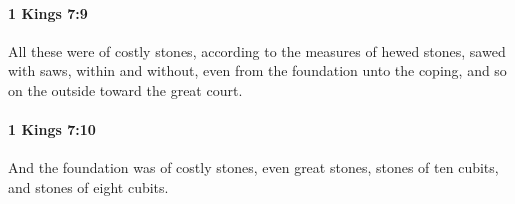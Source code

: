 		\paragraph{1 Kings 7:9} %
			\label{1KINGS-7-9}

			All these were of costly stones, according to the measures of hewed stones, sawed with saws, within and without, even from the foundation unto the coping, and so on the outside toward the great court.


		\paragraph{1 Kings 7:10} %
			\label{1KINGS-7-10}

			And the foundation was of costly stones, even great stones, stones of ten cubits, and stones of eight cubits.


